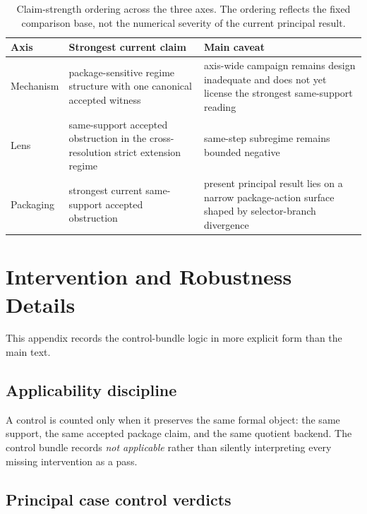 \documentclass[11pt]{article}
\theoremstyle{definition}
\begin{document}
\begin{table}[t]
    \centering
    \caption{Claim-strength ordering across the three axes. The ordering reflects the fixed comparison base, not the numerical severity of the current principal result.}
    \label{tab:claim-ordering}
    \footnotesize
    \begin{tabularx}{\linewidth}{>{\raggedright\arraybackslash}p{1.7cm}>{\raggedright\arraybackslash}p{3.2cm}>{\raggedright\arraybackslash}X}
        \toprule
        Axis & Strongest current claim & Main caveat \\
        \midrule
        Mechanism & package-sensitive regime structure with one canonical accepted witness & axis-wide campaign remains design inadequate and does not yet license the strongest same-support reading \\
        Lens & same-support accepted obstruction in the cross-resolution strict extension regime & same-step subregime remains bounded negative \\
        Packaging & strongest current same-support accepted obstruction & present principal result lies on a narrow package-action surface shaped by selector-branch divergence \\
        \bottomrule
    \end{tabularx}
\end{table}

\section{Intervention and Robustness Details}\label{app:controls}
This appendix records the control-bundle logic in more explicit form than the main text.

\subsection{Applicability discipline}

A control is counted only when it preserves the same formal object: the same support, the same accepted package claim, and the same quotient backend. The control bundle records \emph{not applicable} rather than silently interpreting every missing intervention as a pass.

\subsection{Principal case control verdicts}
\end{document}
